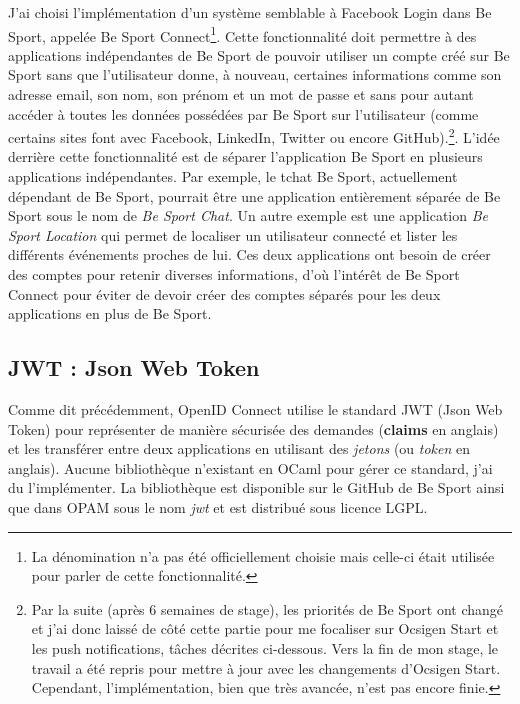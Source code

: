 J'ai choisi l'implémentation d'un système semblable à Facebook
Login\cite{facebook-login} dans Be Sport, appelée Be Sport Connect\footnote{La dénomination n'a pas été officiellement
  choisie mais celle-ci était utilisée pour parler de cette fonctionnalité.}.
Cette fonctionnalité doit permettre à des applications indépendantes de Be Sport
de pouvoir utiliser un compte créé sur Be Sport sans que l'utilisateur donne, à
nouveau, certaines informations comme son adresse email, son nom, son prénom et
un mot de passe et sans pour autant accéder à
toutes les données possédées par Be Sport sur l'utilisateur (comme certains
sites font avec Facebook, LinkedIn, Twitter ou encore GitHub).\footnote{Par la
suite (après 6 semaines de stage), les
  priorités de Be Sport ont changé
  et j'ai donc laissé de côté cette partie pour me focaliser sur Ocsigen Start
  et les push notifications, tâches décrites ci-dessous. Vers la fin de mon
  stage, le travail a été repris pour mettre à jour avec les changements
  d'Ocsigen Start. Cependant, l'implémentation, bien que très avancée, n'est pas
encore finie.}.
L'idée derrière cette fonctionnalité est de séparer l'application Be Sport en
plusieurs applications indépendantes. Par exemple, le tchat Be Sport, actuellement
dépendant de Be Sport, pourrait être une application entièrement séparée de Be
Sport sous le nom de \emph{Be Sport Chat}. Un autre exemple est une application
\emph{Be Sport Location} qui permet de localiser un utilisateur connecté et
lister les différents événements proches de lui. Ces deux applications ont
besoin de créer des comptes pour retenir diverses informations, d'où l'intérêt
de Be Sport Connect pour éviter de devoir créer des comptes séparés pour les
deux applications en plus de Be Sport.


\subsection{JWT : Json Web Token}

Comme dit précédemment, OpenID Connect utilise le standard JWT (Json Web
Token)\cite{official-jwt-website, official-openid-connect-website, rfc-jwt}
pour représenter de manière sécurisée des demandes (\textbf{claims} en anglais) et les
transférer entre deux applications en utilisant des \textit{jetons} (ou
\textit{token} en anglais).
Aucune bibliothèque n'existant en OCaml pour gérer ce standard, j'ai du
l'implémenter. La bibliothèque est disponible sur le GitHub de Be
Sport\cite{ocaml-jwt-github} ainsi que
dans OPAM sous le nom \emph{jwt} et est distribué sous licence LGPL.

